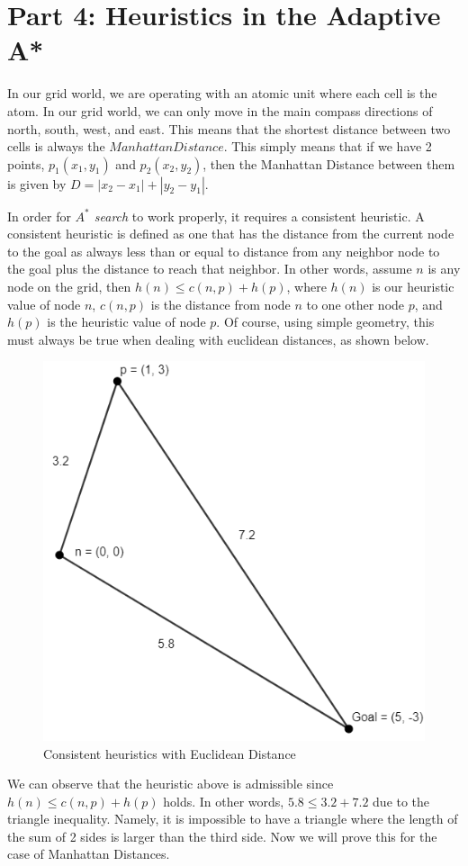 \section{Part 4: Heuristics in the Adaptive A* }
\label{sec: Part 4}

In our grid world, we are operating with an atomic unit where each cell is the atom. In our grid world, we can only move in the main compass directions of north, south, west, and east. This means that the shortest distance between two cells is always the $Manhattan Distance$. This simply means that if we have 2 points, $p_1(x_1,y_1)$ and $p_2(x_2,y_2)$, then the Manhattan Distance between them is given by  $D = |x_2 - x_1| + |y_2 - y_1|$. 


In order for \emph{$A^*$ search} to work properly, it requires a consistent heuristic. A consistent heuristic is defined as one that has the distance from the current node to the goal as always less than or equal to distance from any neighbor node to the goal plus the distance to reach that neighbor. In other words, assume $n$ is any node on the grid, then $h(n) \leq c(n,p) + h(p)$, where $h(n)$ is our heuristic value of node $n$, $c(n,p)$ is the distance from node $n$ to one other node $p$, and $h(p)$ is the heuristic value of node $p$. Of course, using simple geometry, this must always be true when dealing with euclidean distances, as shown below.
\begin{figure}[H]
  \centering
  \includegraphics[width=0.5\linewidth]{Report/Part4/Annotation 2020-07-10 224338.png}  
\caption{Consistent heuristics with Euclidean Distance}
\end{figure}

We can observe that the heuristic above is admissible since $h(n) \leq c(n,p) + h(p)$ holds. In other words, $5.8 \leq 3.2 + 7.2$ due to the triangle inequality. Namely, it is impossible to have a triangle where the length of the sum of 2 sides is larger than the third side. Now we will prove this for the case of Manhattan Distances.



